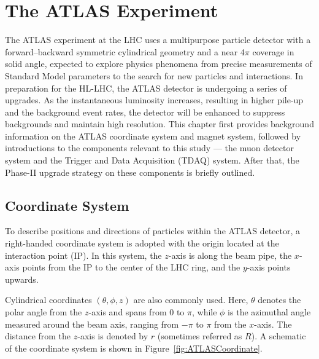 \chapter{The ATLAS Experiment} \label{ch:ATLAS} 
The ATLAS experiment at the LHC uses a multipurpose particle detector with a forward–backward symmetric cylindrical geometry and a near 4$\pi$ coverage in solid angle, expected to explore physics phenomena from precise measurements of Standard Model parameters to the search for new particles and interactions. In preparation for the HL-LHC, the ATLAS detector is undergoing a series of upgrades. As the instantaneous luminosity increases, resulting in higher pile-up and the background event rates, the detector will be enhanced to suppress backgrounds and maintain high resolution. This chapter first provides background information on the ATLAS coordinate system and magnet system, followed by introductions to the components relevant to this study --- the muon detector system and the Trigger and Data Acquisition (TDAQ) system. After that, the Phase-II upgrade strategy on these components is briefly outlined.
\section{Coordinate System} \label{sec:CoordinateSystem}
To describe positions and directions of particles within the ATLAS detector, a right-handed coordinate system is adopted with the origin located at the interaction point (IP). In this system, the \(z\)-axis is along the beam pipe, the \(x\)-axis points from the IP to the center of the LHC ring, and the \(y\)-axis points upwards.

Cylindrical coordinates \((\theta, \phi, z)\) are also commonly used. Here, \(\theta\) denotes the polar angle from the \(z\)-axis and spans from \(0\) to \(\pi\), while \(\phi\) is the azimuthal angle measured around the beam axis, ranging from \(-\pi\) to \(\pi\) from the \(x\)-axis. The distance from the \(z\)-axis is denoted by \(r\) (sometimes referred as \(R\)). A schematic of the coordinate system is shown in Figure~\ref{fig:ATLASCoordinate}.

